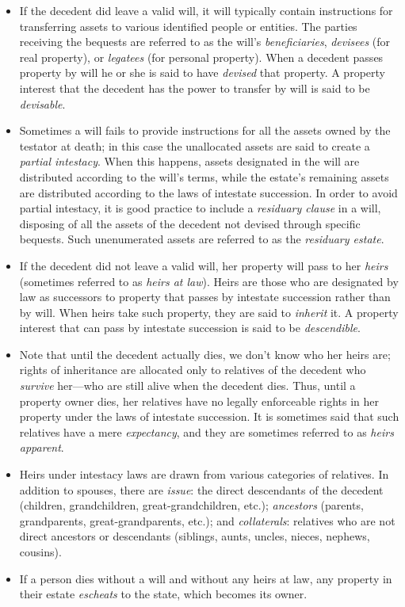 \begin{itemize}
\item If the decedent did leave a valid will, it will typically contain
instructions for transferring assets to various identified people or entities.
The parties receiving the bequests are referred to as the will's
\textit{beneficiaries}, \textit{devisees} (for real property),
or \textit{legatees} (for personal property). When a decedent passes property
by will he or she is said to have \textit{devised} that property. A property
interest that the decedent has the power to transfer by will is said to be
\textit{devisable}. 

\item Sometimes a will fails to provide instructions for all the assets owned by
the testator at death; in this case the unallocated assets are said to create a
\textit{partial intestacy}. When this happens, assets designated in the will
are distributed according to the will's terms, while the estate's remaining
assets are distributed according to the laws of intestate succession. In order
to avoid partial intestacy, it is good practice to include a \textit{residuary
clause} in a will, disposing of all the assets of the decedent not devised
through specific bequests. Such unenumerated assets are referred to as the
\textit{residuary estate}.

\item If the decedent did not leave a valid will, her property will pass to her
\textit{heirs} (sometimes referred to as \textit{heirs at law}). Heirs are
those who are designated by law as successors to property that passes by
intestate succession rather than by will. When heirs take such property, they
are said to \textit{inherit} it. A property interest that can pass by intestate
succession is said to be \textit{descendible}.

\item Note that until the decedent actually dies, we don't know who her heirs
are; rights of inheritance are allocated only to relatives of the decedent who
\textit{survive} her---who are still alive when the decedent dies. Thus, until
a property owner dies, her relatives have no legally enforceable rights in her
property under the laws of intestate succession. It is sometimes said that such
relatives have a mere \textit{expectancy}, and they are sometimes referred to
as \textit{heirs apparent}.

\item Heirs under intestacy laws are drawn from various categories of relatives.
In addition to spouses, there are \textit{issue}: the direct descendants of the
decedent (children, grandchildren, great-grandchildren, etc.);
\textit{ancestors} (parents, grandparents, great-grandparents, etc.); and
\textit{collaterals}: relatives who are not direct ancestors or descendants
(siblings, aunts, uncles, nieces, nephews, cousins).

\item If a person dies without a will and without any heirs at law, any property
in their estate \textit{escheats} to the state, which becomes its owner.
\end{itemize}



